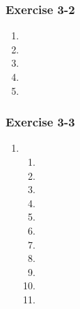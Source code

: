 {\begin{multicols}{3}
\subsubsection*{Exercise 3-2} %

\begin{enumerate}[label=\textbf{\arabic*}., noitemsep]
 \item %
 \item %
 \item %
 \item %
 \item %
\end{enumerate}

\subsubsection*{Exercise 3-3} %
\begin{enumerate}[label=\textbf{\arabic*}., noitemsep]
\item %

\begin{enumerate}[label=\textbf{(\alph*)}, noitemsep]

\item %
\item %
\item %
\item %
\item %

\item %
\item %
\item %
\item %
\item %
\item %

\end{enumerate}


\end{enumerate}
\end{multicols}}
